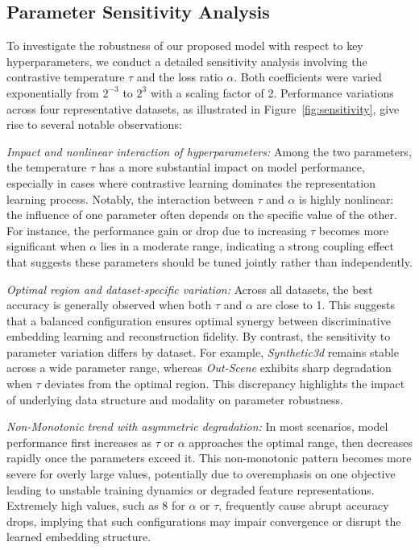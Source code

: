 \documentclass[10pt, journal, compsoc]{IEEEtran}
\begin{document}
\subsection{Parameter Sensitivity Analysis}
To investigate the robustness of our proposed model with respect to key hyperparameters, we conduct a detailed sensitivity analysis involving the contrastive temperature $\tau$ and the loss ratio $\alpha$. Both coefficients were varied exponentially from $2^{-3}$ to $2^{3}$ with a scaling factor of 2. Performance variations across four representative datasets, as illustrated in Figure~\ref{fig:sensitivity}, give rise to several notable observations:

\noindent
\textcolor{c1}{\textit{Impact and nonlinear interaction of hyperparameters:}} Among the two parameters, the temperature $\tau$ has a more substantial impact on model performance, especially in cases where contrastive learning dominates the representation learning process. Notably, the interaction between $\tau$ and $\alpha$ is highly nonlinear: the influence of one parameter often depends on the specific value of the other. For instance, the performance gain or drop due to increasing $\tau$ becomes more significant when $\alpha$ lies in a moderate range, indicating a strong coupling effect that suggests these parameters should be tuned jointly rather than independently.

\noindent
\textcolor{c1}{\textit{Optimal region and dataset-specific variation:}} Across all datasets, the best accuracy is generally observed when both $\tau$ and $\alpha$ are close to 1. This suggests that a balanced configuration ensures optimal synergy between discriminative embedding learning and reconstruction fidelity. By contrast, the sensitivity to parameter variation differs by dataset. For example, \textit{Synthetic3d} remains stable across a wide parameter range, whereas \textit{Out-Scene} exhibits sharp degradation when $\tau$ deviates from the optimal region. This discrepancy highlights the impact of underlying data structure and modality on parameter robustness.

\noindent
\textcolor{c1}{\textit{Non-Monotonic trend with asymmetric degradation:}}
In most scenarios, model performance first increases as $\tau$ or $\alpha$ approaches the optimal range, then decreases rapidly once the parameters exceed it. This non-monotonic pattern becomes more severe for overly large values, potentially due to overemphasis on one objective leading to unstable training dynamics or degraded feature representations. Extremely high values, such as $8$ for $\alpha$ or $\tau$, frequently cause abrupt accuracy drops, implying that such configurations may impair convergence or disrupt the learned embedding structure.
\end{document}
